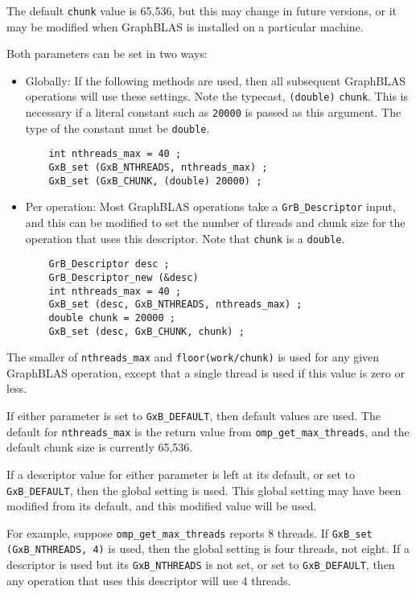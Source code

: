\documentclass[12pt]{article}
\begin{document}
The default \verb'chunk' value is 65,536, but this may change in future versions,
or it may be modified when GraphBLAS is installed on a particular machine.

Both parameters can be set in two ways:

\begin{itemize}

\item Globally:  If the following methods are used, then all subsequent
GraphBLAS operations will use these settings.  Note the typecast,
\verb'(double)' \verb'chunk'.  This is necessary if a literal constant such as
\verb'20000' is passed as this argument.  The type of the constant must be
\verb'double'.

    {\footnotesize
    \begin{verbatim}
    int nthreads_max = 40 ;
    GxB_set (GxB_NTHREADS, nthreads_max) ;
    GxB_set (GxB_CHUNK, (double) 20000) ; \end{verbatim} }

\item Per operation:  Most GraphBLAS operations take a \verb'GrB_Descriptor'
input, and this can be modified to set the number of threads and chunk
size for the operation that uses this descriptor.  Note that \verb'chunk'
is a \verb'double'.

    {\footnotesize
    \begin{verbatim}
    GrB_Descriptor desc ;
    GrB_Descriptor_new (&desc)
    int nthreads_max = 40 ;
    GxB_set (desc, GxB_NTHREADS, nthreads_max) ;
    double chunk = 20000 ;
    GxB_set (desc, GxB_CHUNK, chunk) ; \end{verbatim} }

\end{itemize}

The smaller of \verb'nthreads_max' and \verb'floor(work/chunk)' is used for any
given GraphBLAS operation, except that a single thread is used if this value is
zero or less.

If either parameter is set to \verb'GxB_DEFAULT', then default values are used.
The default for \verb'nthreads_max' is the return value from
\verb'omp_get_max_threads', and the default chunk size is currently 65,536.

If a descriptor value for either parameter is left at its default, or set to
\verb'GxB_DEFAULT', then the global setting is used.  This global setting may
have been modified from its default, and this modified value will be used.

For example, suppose \verb'omp_get_max_threads' reports 8 threads.  If \newline
\verb'GxB_set (GxB_NTHREADS, 4)' is used, then the global setting is four
threads, not eight.  If a descriptor is used but its \verb'GxB_NTHREADS' is not
set, or set to \verb'GxB_DEFAULT', then any operation that uses this descriptor
will use 4 threads.
\end{document}
